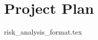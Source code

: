 \documentclass{article}
\begin{document}

\section*{Project Plan}
{risk_analysis_format.tex}



\end{document}
